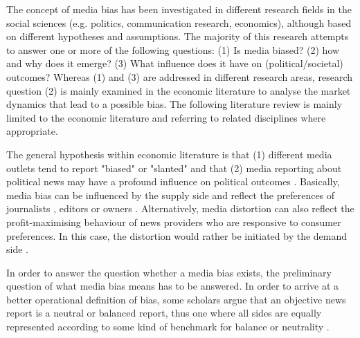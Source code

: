 \documentclass[12pt,a4paper,notitlepage]{article}
\begin{document}
The concept of media bias has been investigated in different research fields in the social sciences (e.g. politics, communication research, economics), although based on different hypotheses and assumptions. The majority of this research attempts to answer one or more of the following questions: (1) Is media biased? (2) how and why does it emerge? (3) What influence does it have on (political/societal) outcomes? Whereas (1) and (3) are addressed in different research areas, research question (2) is mainly examined in the economic literature to analyse the market dynamics that lead to a possible bias. The following literature review is mainly limited to the economic literature and referring to related disciplines where appropriate. 

The general hypothesis within economic literature is that (1) different media outlets tend to report "biased" or "slanted" \citep{groseclose_measure_2005, lott_is_2014} and that (2) media reporting about political news may have a profound influence on political outcomes \citep{gentzkow_media_2004, stromberg_radios_2004, dellavigna_fox_2006, snyder_press_2010, gentzkow_television_2006}. Basically, media bias can be influenced by the supply side and reflect the preferences of journalists \citep{baron_persistent_2006}, editors or owners \citep{besley_handcuffs_2006}. Alternatively, media distortion can also reflect the profit-maximising behaviour of news providers who are responsive to consumer preferences. In this case, the distortion would rather be initiated by the demand side \citep{mullainathan_market_2005, gentzkow_media_2006, suen_self-perpetuation_2004}. 

In order to answer the question whether a media bias exists, the preliminary question of what media bias means has to be answered. In order to arrive at a better operational definition of bias, some scholars argue that an objective news report is a neutral or balanced report, thus one where all sides are equally represented according to some kind of benchmark for balance or neutrality \citep{eberl_one_2017}. 
\end{document}
